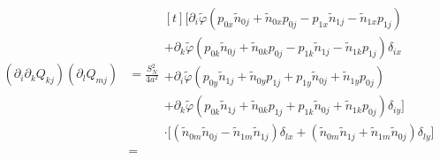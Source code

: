 \documentclass[reqno]{article}
\newcommand{\phitilde}{\tilde{\varphi}}
\begin{document}
\begin{equation}
\begin{split}
    \left( \partial_i \partial_k Q_{k j} \right) \left( \partial_l Q_{m j} \right)
    &=
    \frac{S_N^2}{4 a^2}
    \begin{multlined}[t]
    \biggl[
         \partial_i \phitilde \left( p_{0x} \tilde{n}_{0j} + \tilde{n}_{0x} p_{0j} - p_{1x} \tilde{n}_{1j} - \tilde{n}_{1x} p_{1j} \right) \\
        + \partial_k \phitilde \left( 
            p_{0k} \tilde{n}_{0j} + \tilde{n}_{0k} p_{0j} - p_{1k} \tilde{n}_{1j} - \tilde{n}_{1k} p_{1j}
        \right) \delta_{ix} \\
        + \partial_i \phitilde \left( 
            p_{0y} \tilde{n}_{1j} + \tilde{n}_{0y} p_{1j} + p_{1y} \tilde{n}_{0j} + \tilde{n}_{1y} p_{0j}
        \right) \\
        + \partial_k \phitilde  \left( 
            p_{0k} \tilde{n}_{1j} + \tilde{n}_{0k} p_{1j} + p_{1k} \tilde{n}_{0j} + \tilde{n}_{1k} p_{0j}
        \right) \delta_{i y}
    \biggr] \\
    \cdot 
    \bigl[
        \left( \tilde{n}_{0m} \tilde{n}_{0j} - \tilde{n}_{1m} \tilde{n}_{1j} \right)\delta_{l x} 
        + \left( \tilde{n}_{0m} \tilde{n}_{1j} + \tilde{n}_{1m} \tilde{n}_{0j} \right) \delta_{l y}
    \bigr]
    \end{multlined} \\
    &=
\end{split}
\end{equation}
\end{document}
